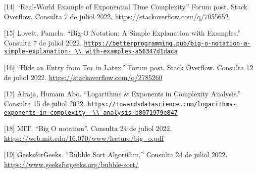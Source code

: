 [14] “Real-World Example of Exponential Time Complexity.” Forum post. Stack Overflow, Consulta 7 de juliol 2022. \url{https://stackoverflow.com/q/7055652}

[15] Lovett, Pamela. “Big-O Notation: A Simple Explanation with Examples.” Consulta 7 de juliol 2022. \href{https://betterprogramming.pub/big-o-notation-a-simple-explanation-with-examples-a56347d1daca}{\nolinkurl{https://betterprogramming.pub/big-o-notation-a-simple-explanation- \\ with-examples-a56347d1daca}}

[16] “Hide an Entry from Toc in Latex.” Forum post. Stack Overflow. Consulta 12 de juliol 2022. \url{https://stackoverflow.com/q/2785260}

[17] Alraja, Humam Abo. “Logarithms & Exponents in Complexity Analysis.” Consulta 15 de juliol 2022. \href{https://towardsdatascience.com/logarithms-exponents-in-complexity-analysis-b8071979e847}{\nolinkurl{https://towardsdatascience.com/logarithms-exponents-in-complexity- \\ analysis-b8071979e847}}

[18] MIT. “Big O notation”.  Consulta 24 de juliol 2022. \url{https://web.mit.edu/16.070/www/lecture/big_o.pdf}

[19] GeeksforGeeks. “Bubble Sort Algorithm,” Consulta 24 de juliol 2022. \url{https://www.geeksforgeeks.org/bubble-sort/}

